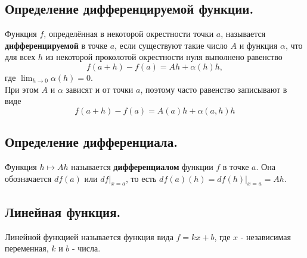 

\label{sec_Definition05}
\begin{definition}
    \subsection*{Определение дифференцируемой функции.}
    \begin{note}[purple]
        Функция $f$, определённая в некоторой окрестности точки $a$,
        называется \textbf{дифференцируемой} в точке $a$, если 
        существуют такие число $A$ и функция $\alpha$, что 
        для всех $h$ из некоторой проколотой окрестности нуля 
        выполнено равенство 
        $$f(a + h) - f(a) = Ah + \alpha(h)h,$$ 
        где $\displaystyle{\lim_{h \rightarrow 0} \alpha(h) = 0}$. \\
        При этом $A$ и $\alpha$ зависят и от точки $a$, поэтому часто
        равенство записывают в виде 
        $$ f(a + h) - f(a) = A(a)h + \alpha(a, h)h $$
    \end{note}

    \subsection*{Определение дифференциала.}
    \begin{note}[purple]
        Функция $h \mapsto Ah$ называется \textbf{дифференциалом} 
        функции $f$ в точке $a$. Она обозначается $df(a)$ или
        $df | _{x = a}$, то есть $df(a)(h) = df(h)|_{x = a} = Ah$.
    \end{note}

    \subsection*{Линейная функция.}
    \begin{note}[purple]
        Линейной функцией называется функция вида $f = kx + b$, 
        где $x$ - независимая переменная, $k$ и $b$ - числа. 
    \end{note}
\end{definition}